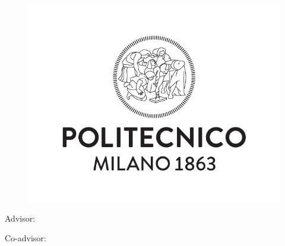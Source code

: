 \begin{titlepage}
    \begin{center}
    	\Large
    	\spacedlowsmallcaps{\myUni} \\
    	\large
        \bigskip\myFaculty \\
        \medskip\mySchool \\
    	\medskip\myDepartment \\
    	\bigskip\myCourseFirstPart \\
        \medskip\myCourseSecondPart \\  

        \hfill

        \vfill
        
        \begin{figure}[!h]
			\begin{center}
				\includegraphics[width=0.3\columnwidth]{Images/logoPoli.pdf} 
			\end{center}
		\end{figure}
		
		\vfill

        \begingroup
       		\LARGE	
            \myTitle
            \bigskip
        \endgroup

        \vfill

		\flushleft 
		\normalsize{Advisor:}
		\medskip\spacedlowsmallcaps{\mySupervisor}

		\normalsize{Co-advisor:}
		\medskip\spacedlowsmallcaps{\myOtherSupervisor}\\
        

\end{center}
\end{titlepage}
